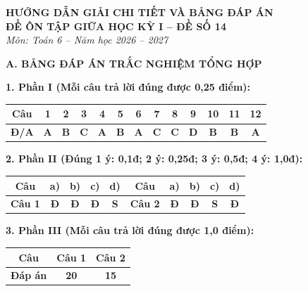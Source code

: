 \documentclass[12pt,a4paper]{article}
\begin{document}
\begin{center}
  \textbf{\Large HƯỚNG DẪN GIẢI CHI TIẾT VÀ BẢNG ĐÁP ÁN}\\
  \textbf{\large ĐỀ ÔN TẬP GIỮA HỌC KỲ I -- ĐỀ SỐ 14}\\
  \textit{Môn: Toán 6 -- Năm học 2026 -- 2027}
\end{center}
\vspace{2mm}

\noindent\textbf{\large A. BẢNG ĐÁP ÁN TRẮC NGHIỆM TỔNG HỢP}
\vspace{1.5mm}

\noindent\textbf{1. Phần I (Mỗi câu trả lời đúng được 0,25 điểm):}
\begin{center}
\begin{tabular}{|c|c|c|c|c|c|c|c|c|c|c|c|c|}
\hline
\textbf{Câu} & \textbf{1} & \textbf{2} & \textbf{3} & \textbf{4} & \textbf{5} & \textbf{6} & \textbf{7} & \textbf{8} & \textbf{9} & \textbf{10} & \textbf{11} & \textbf{12} \\
\hline
\textbf{Đ/A} & \textbf{A} & \textbf{B} & \textbf{C} & \textbf{A} & \textbf{B} & \textbf{A} & \textbf{C} & \textbf{C} & \textbf{D} & \textbf{B} & \textbf{B} & \textbf{A} \\
\hline
\end{tabular}
\end{center}
\vspace{1mm}

\noindent\textbf{2. Phần II (Đúng 1 ý: 0,1đ; 2 ý: 0,25đ; 3 ý: 0,5đ; 4 ý: 1,0đ):}
\begin{center}
\begin{tabular}{|c|c|c|c|c||c|c|c|c|c|}
\hline
\textbf{Câu} & \textbf{a)} & \textbf{b)} & \textbf{c)} & \textbf{d)} & \textbf{Câu} & \textbf{a)} & \textbf{b)} & \textbf{c)} & \textbf{d)} \\
\hline
\textbf{Câu 1} & \textbf{Đ} & \textbf{Đ} & \textbf{Đ} & \textbf{S} & \textbf{Câu 2} & \textbf{Đ} & \textbf{Đ} & \textbf{S} & \textbf{Đ} \\
\hline
\end{tabular}
\end{center}
\vspace{1mm}

\noindent\textbf{3. Phần III (Mỗi câu trả lời đúng được 1,0 điểm):}
\begin{center}
\begin{tabular}{|c|c|c|}
\hline
\textbf{Câu} & \textbf{Câu 1} & \textbf{Câu 2} \\
\hline
\textbf{Đáp án} & \textbf{20} & \textbf{15} \\
\hline
\end{tabular}
\end{center}
\vspace{3mm}
\end{document}
